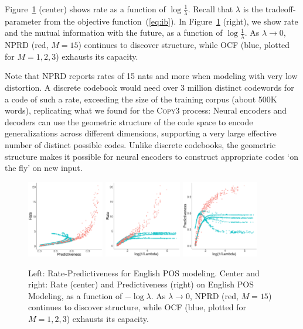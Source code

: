 \documentclass[entropy,article,submit,moreauthors,pdftex,10pt,a4paper]{Definitions/mdpi}
\begin{document}
Figure~\ref{fig:eng-pos} (center) shows rate as a function of $\log \frac{1}{\lambda}$.
Recall that $\lambda$ is the tradeoff-parameter from the objective function~(\ref{eq:ib}).
In Figure~\ref{fig:eng-pos} (right), we show rate and the mutual information with the future, as a function of $\log \frac{1}{\lambda}$.
As $\lambda \rightarrow 0$, NPRD (red, $M=15$) continues to discover structure, while OCF (blue, plotted for $M=1,2,3$) exhausts its capacity.

Note that NPRD reports rates of 15 nats and more when modeling with very low distortion.
A discrete codebook would need over 3 million distinct codewords for a code of such a rate, exceeding the size of the training corpus (about 500K words), replicating what we found for the \textsc{Copy3} process:
Neural encoders and decoders can use the geometric structure of the code space to encode generalizations across different dimensions, supporting a very large effective number of distinct possible codes.
Unlike discrete codebooks, the geometric structure makes it possible for neural encoders to construct appropriate codes `on the fly' on new input.



\begin{figure}
\includegraphics[width=0.3\textwidth]{code/figures/english-info.pdf}
\includegraphics[width=0.3\textwidth]{code/figures/english-nlogbeta-mem.pdf}
\includegraphics[width=0.3\textwidth]{code/figures/english-nlogbeta-ee.pdf}
	\caption{Left: Rate-Predictiveness for English POS modeling. Center and right: Rate (center) and Predictiveness (right) on English POS Modeling, as a function of $-\log \lambda$. As $\lambda \rightarrow 0$, NPRD (red, $M=15$) continues to discover structure, while OCF (blue, plotted for $M=1,2,3$) exhausts its capacity. }\label{fig:eng-pos}
\end{figure}
\end{document}
